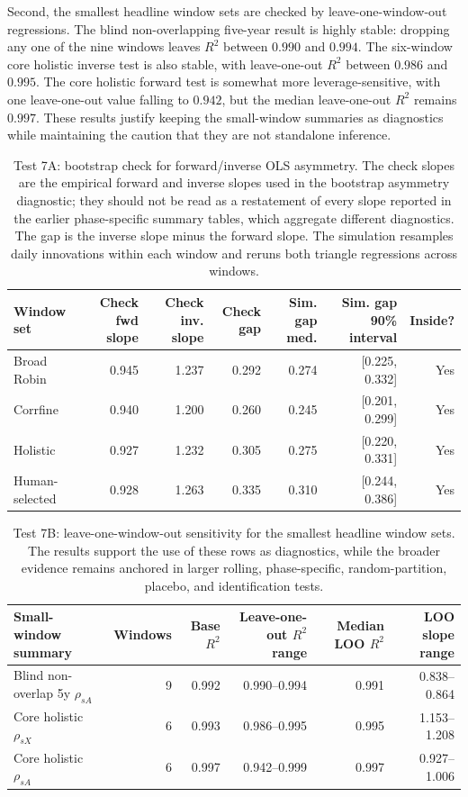 \documentclass[11pt]{article}
\begin{document}
Second, the smallest headline window sets are checked by leave-one-window-out regressions. The blind non-overlapping five-year result is highly stable: dropping any one of the nine windows leaves $R^2$ between $0.990$ and $0.994$. The six-window core holistic inverse test is also stable, with leave-one-out $R^2$ between $0.986$ and $0.995$. The core holistic forward test is somewhat more leverage-sensitive, with one leave-one-out value falling to $0.942$, but the median leave-one-out $R^2$ remains $0.997$. These results justify keeping the small-window summaries as diagnostics while maintaining the caution that they are not standalone inference.

\begin{table}[!htbp]
\centering
\scriptsize
\begin{tabular}{lrrrrrr}
\toprule
Window set & Check fwd slope & Check inv. slope & Check gap & Sim. gap med. & Sim. gap 90\% interval & Inside? \\
\midrule
Broad Robin & 0.945 & 1.237 & 0.292 & 0.274 & [0.225, 0.332] & Yes \\
Corrfine & 0.940 & 1.200 & 0.260 & 0.245 & [0.201, 0.299] & Yes \\
Holistic & 0.927 & 1.232 & 0.305 & 0.275 & [0.220, 0.331] & Yes \\
Human-selected & 0.928 & 1.263 & 0.335 & 0.310 & [0.244, 0.386] & Yes \\
\bottomrule
\end{tabular}
\caption{Test 7A: bootstrap check for forward/inverse OLS asymmetry. The check slopes are the empirical forward and inverse slopes used in the bootstrap asymmetry diagnostic; they should not be read as a restatement of every slope reported in the earlier phase-specific summary tables, which aggregate different diagnostics. The gap is the inverse slope minus the forward slope. The simulation resamples daily innovations within each window and reruns both triangle regressions across windows.}
\label{tab:test7_eiv}
\end{table}

\begin{table}[!htbp]
\centering
\scriptsize
\begin{tabular}{lrrrrr}
\toprule
Small-window summary & Windows & Base $R^2$ & Leave-one-out $R^2$ range & Median LOO $R^2$ & LOO slope range \\
\midrule
Blind non-overlap 5y $\rho_{sA}$ & 9 & 0.992 & 0.990--0.994 & 0.991 & 0.838--0.864 \\
Core holistic $\rho_{sX}$ & 6 & 0.993 & 0.986--0.995 & 0.995 & 1.153--1.208 \\
Core holistic $\rho_{sA}$ & 6 & 0.997 & 0.942--0.999 & 0.997 & 0.927--1.006 \\
\bottomrule
\end{tabular}
\caption{Test 7B: leave-one-window-out sensitivity for the smallest headline window sets. The results support the use of these rows as diagnostics, while the broader evidence remains anchored in larger rolling, phase-specific, random-partition, placebo, and identification tests.}
\label{tab:test7_loo}
\end{table}
\end{document}
